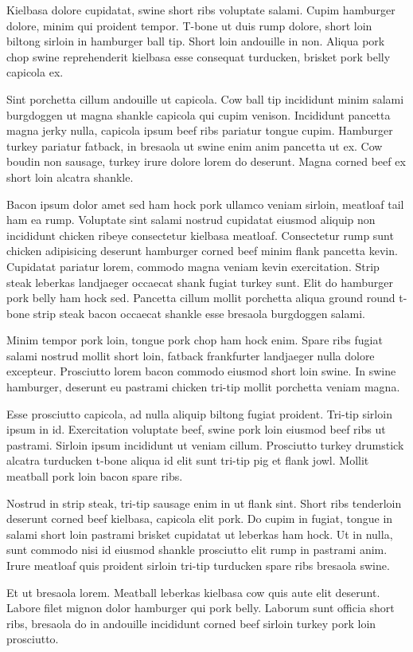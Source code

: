 \documentclass{article}
\begin{document}
 Kielbasa dolore cupidatat, swine short ribs voluptate salami. Cupim hamburger dolore, minim qui proident tempor. T-bone ut duis rump dolore, short loin biltong sirloin in hamburger ball tip. Short loin andouille in non. Aliqua pork chop swine reprehenderit kielbasa esse consequat turducken, brisket pork belly capicola ex.

 Sint porchetta cillum andouille ut capicola. Cow ball tip incididunt minim salami burgdoggen ut magna shankle capicola qui cupim venison. Incididunt pancetta magna jerky nulla, capicola ipsum beef ribs pariatur tongue cupim. Hamburger turkey pariatur fatback, in bresaola ut swine enim anim pancetta ut ex. Cow boudin non sausage, turkey irure dolore lorem do deserunt. Magna corned beef ex short loin alcatra shankle.

Bacon ipsum dolor amet sed ham hock pork ullamco veniam sirloin, meatloaf tail ham ea rump. Voluptate sint salami nostrud cupidatat eiusmod aliquip non incididunt chicken ribeye consectetur kielbasa meatloaf. Consectetur rump sunt chicken adipisicing deserunt hamburger corned beef minim flank pancetta kevin. Cupidatat pariatur lorem, commodo magna veniam kevin exercitation. Strip steak leberkas landjaeger occaecat shank fugiat turkey sunt. Elit do hamburger pork belly ham hock sed. Pancetta cillum mollit porchetta aliqua ground round t-bone strip steak bacon occaecat shankle esse bresaola burgdoggen salami.

Minim tempor pork loin, tongue pork chop ham hock enim. Spare ribs fugiat salami nostrud mollit short loin, fatback frankfurter landjaeger nulla dolore excepteur. Prosciutto lorem bacon commodo eiusmod short loin swine. In swine hamburger, deserunt eu pastrami chicken tri-tip mollit porchetta veniam magna.

Esse prosciutto capicola, ad nulla aliquip biltong fugiat proident. Tri-tip sirloin ipsum in id. Exercitation voluptate beef, swine pork loin eiusmod beef ribs ut pastrami. Sirloin ipsum incididunt ut veniam cillum. Prosciutto turkey drumstick alcatra turducken t-bone aliqua id elit sunt tri-tip pig et flank jowl. Mollit meatball pork loin bacon spare ribs.

Nostrud in strip steak, tri-tip sausage enim in ut flank sint. Short ribs tenderloin deserunt corned beef kielbasa, capicola elit pork. Do cupim in fugiat, tongue in salami short loin pastrami brisket cupidatat ut leberkas ham hock. Ut in nulla, sunt commodo nisi id eiusmod shankle prosciutto elit rump in pastrami anim. Irure meatloaf quis proident sirloin tri-tip turducken spare ribs bresaola swine.

Et ut bresaola lorem. Meatball leberkas kielbasa cow quis aute elit deserunt. Labore filet mignon dolor hamburger qui pork belly. Laborum sunt officia short ribs, bresaola do in andouille incididunt corned beef sirloin turkey pork loin prosciutto.
\end{document}
